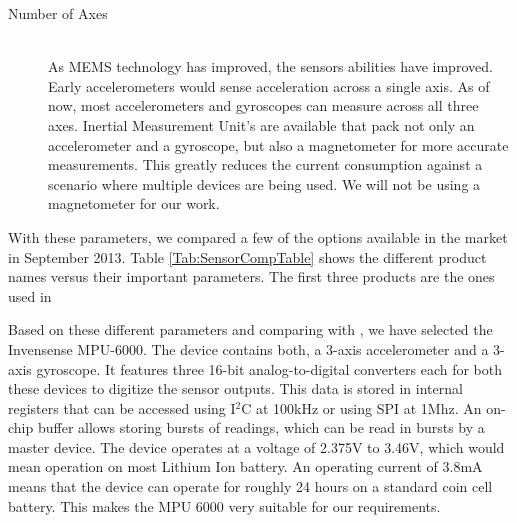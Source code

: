 \begin{description}
\item[Number of Axes] \hfill \\
As MEMS technology has improved, the sensors abilities have improved. Early accelerometers would sense acceleration across a single axis. As of now, most accelerometers and gyroscopes can measure across all three axes. Inertial Measurement Unit's are available that pack not only an accelerometer and a gyroscope, but also a magnetometer for more accurate measurements. This greatly reduces the current consumption against a scenario where multiple devices are being used. We will not be using a magnetometer for our work.
\end{description}
With these parameters, we compared a few of the options available in the market in September 2013. Table \ref{Tab:SensorCompTable} shows the different product names versus their important parameters. The first three products are the ones used in \cite{drennan2010assessment}


Based on these different parameters and comparing with \cite{drennan2010assessment}, we have selected the Invensense MPU-6000. The device contains both, a 3-axis accelerometer and a 3-axis gyroscope. It features three 16-bit analog-to-digital converters each for both these devices to digitize the sensor outputs. This data is stored in internal registers that can be accessed using I$^{2}$C at 100kHz or using SPI at 1Mhz. An on-chip buffer allows storing bursts of readings, which can be read in bursts by a master device. The device operates at a voltage of 2.375V to 3.46V, which would mean operation on most Lithium Ion battery. An operating current of 3.8mA means that the device can operate for roughly 24 hours on a standard coin cell battery. This makes the MPU 6000 very suitable for our requirements.

